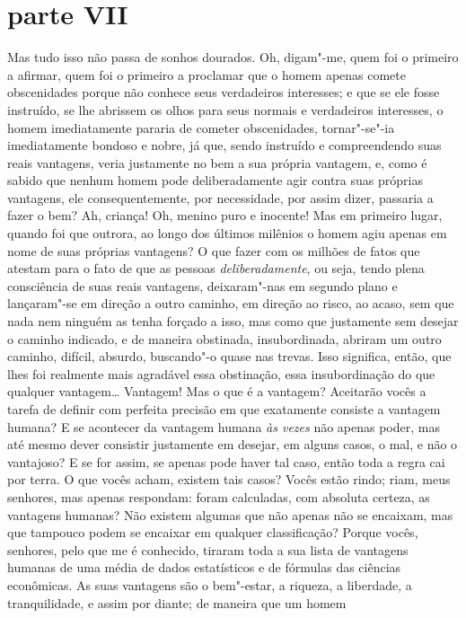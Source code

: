 \section{parte VII}

Mas tudo isso não passa de sonhos dourados. Oh, digam"-me, quem foi o
primeiro a afirmar, quem foi o primeiro a proclamar que o homem apenas
comete obscenidades porque não conhece seus verdadeiros interesses; e
que se ele fosse instruído, se lhe abrissem os olhos para seus normais
e verdadeiros interesses, o homem imediatamente pararia de cometer
obscenidades, tornar"-se"-ia imediatamente bondoso e nobre, já que, sendo
instruído e compreendendo suas reais vantagens, veria justamente no bem
a sua própria vantagem, e, como é sabido que nenhum homem pode
deliberadamente agir contra suas próprias vantagens, ele
consequentemente, por necessidade, por assim dizer, passaria a fazer o
bem? Ah, criança! Oh, menino puro e inocente! Mas em primeiro lugar,
quando foi que outrora, ao longo dos últimos milênios o homem agiu
apenas em nome de suas próprias vantagens? O que fazer com os milhões
de fatos que atestam para o fato de que as pessoas
\textit{deliberadamente}, ou seja, tendo plena consciência de suas
reais vantagens, deixaram"-nas em segundo plano e lançaram"-se em direção
a outro caminho, em direção ao risco, ao acaso, sem que nada nem
ninguém as tenha forçado a isso, mas como que justamente sem desejar o
caminho indicado, e de maneira obstinada, insubordinada, abriram um
outro caminho, difícil, absurdo, buscando"-o quase nas trevas. Isso
significa, então, que lhes foi realmente mais agradável essa
obstinação, essa insubordinação do que qualquer vantagem\ldots{} Vantagem!
Mas o que é a vantagem? Aceitarão vocês a tarefa de definir com
perfeita precisão em que exatamente consiste a vantagem humana? E se
acontecer da vantagem humana \textit{às vezes} não
apenas poder, mas até mesmo dever consistir justamente em desejar, em
alguns casos, o mal, e não o vantajoso? E se for assim, se apenas pode
haver tal caso, então toda a regra cai por terra. O que vocês acham,
existem tais casos? Vocês estão rindo; riam, meus senhores, mas apenas
respondam: foram calculadas, com absoluta certeza, as vantagens
humanas? Não existem algumas que não apenas não se encaixam, mas que
tampouco podem se encaixar em qualquer classificação? Porque vocês,
senhores, pelo que me é conhecido, tiraram toda a sua lista de
vantagens humanas de uma média de dados estatísticos e de fórmulas das
ciências econômicas. As suas vantagens são o bem"-estar, a riqueza, a
liberdade, a tranquilidade, e assim por diante; de maneira que um homem
